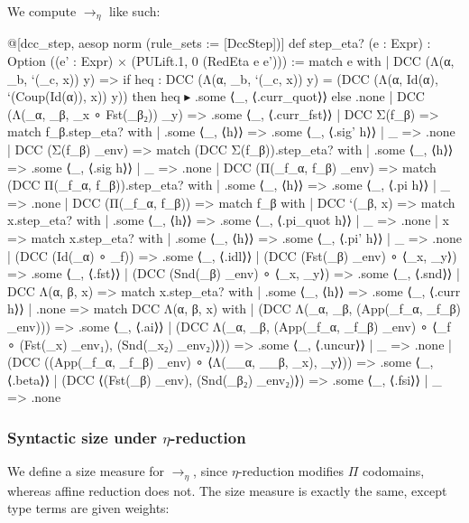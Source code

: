 \documentclass{article}
\newcommand{\etaarr}{\rightarrow_{\eta}}
\begin{document}
We compute \(\rightarrow_{\eta}\) like such:

\begin{leancode}
@[dcc_step, aesop norm (rule_sets := [DccStep])]
def step_eta? (e : Expr) : Option ((e' : Expr) × (PULift.{1, 0} (RedEta e e'))) :=
  match e with
  | DCC (Λ(α, _b, `(_c, x)) y) =>
    if heq : DCC (Λ(α, _b, `(_c, x)) y) = (DCC (Λ(α, Id(α), `(Coup(Id(α)), x)) y)) then
      heq ▸ .some ⟨_, ⟨.curr_quot⟩⟩
    else .none
  | DCC (Λ(_α, _β, _x ∘ Fst(_β₂)) _y) => .some ⟨_, ⟨.curr_fst⟩⟩
  | DCC Σ(f_β) =>
    match f_β.step_eta? with
    | .some ⟨_, ⟨h⟩⟩ => .some ⟨_, ⟨.sig' h⟩⟩
    | _ => .none
  | DCC (Σ(f_β) _env) =>
    match (DCC Σ(f_β)).step_eta? with
    | .some ⟨_, ⟨h⟩⟩ => .some ⟨_, ⟨.sig h⟩⟩
    | _ => .none
  | DCC (Π(_f_α, f_β) _env) =>
    match (DCC Π(_f_α, f_β)).step_eta? with
    | .some ⟨_, ⟨h⟩⟩ => .some ⟨_, ⟨.pi h⟩⟩
    | _ => .none
  | DCC (Π(_f_α, f_β)) =>
    match f_β with
    | DCC `(_β, x) =>
      match x.step_eta? with
      | .some ⟨_, ⟨h⟩⟩ => .some ⟨_, ⟨.pi_quot h⟩⟩
      | _ => .none
    | x =>
      match x.step_eta? with
      | .some ⟨_, ⟨h⟩⟩ => .some ⟨_, ⟨.pi' h⟩⟩
      | _ => .none
  | (DCC (Id(_α) ∘ _f)) => .some ⟨_, ⟨.idl⟩⟩
  | (DCC (Fst(_β) _env) ∘ ⟨_x, _y⟩) => .some ⟨_, ⟨.fst⟩⟩
  | (DCC (Snd(_β) _env) ∘ ⟨_x, _y⟩) => .some ⟨_, ⟨.snd⟩⟩
  | DCC Λ(α, β, x) =>
    match x.step_eta? with
    | .some ⟨_, ⟨h⟩⟩ => .some ⟨_, ⟨.curr h⟩⟩
    | .none =>
      match DCC Λ(α, β, x) with
      | (DCC Λ(_α, _β, (App(_f_α, _f_β) _env))) => .some ⟨_, ⟨.ai⟩⟩
      | (DCC Λ(_α, _β,
        (App(_f_α, _f_β) _env) ∘ ⟨_f ∘ (Fst(_x) _env₁), (Snd(_x₂) _env₂)⟩)) =>
        .some ⟨_, ⟨.uncur⟩⟩
      | _ => .none
  | (DCC ((App(_f_α, _f_β) _env) ∘ ⟨Λ(__α, __β, _x), _y⟩)) => .some ⟨_, ⟨.beta⟩⟩
  | (DCC ⟨(Fst(_β) _env), (Snd(_β₂) _env₂)⟩) => .some ⟨_, ⟨.fsi⟩⟩
  | _ => .none
\end{leancode}

\subsubsection{Syntactic size under \(\eta\)-reduction}

We define a size measure for \(\etaarr\), since \(\eta\)-reduction modifies \(\Pi\) codomains, whereas affine reduction does not. The size measure is exactly the same, except type terms are given weights:
\end{document}
